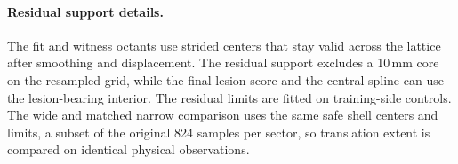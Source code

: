 \paragraph{Residual support details.}
The fit and witness octants use strided centers that stay valid across the lattice after smoothing and displacement.
The residual support excludes a 10\,mm core on the resampled grid, while the final lesion score and the central spline can use the lesion-bearing interior.
The residual limits are fitted on training-side controls.
The wide and matched narrow comparison uses the same safe shell centers and limits, a subset of the original 824 samples per sector, so translation extent is compared on identical physical observations.
